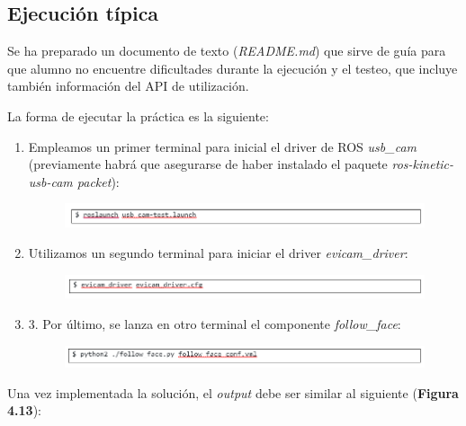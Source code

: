 \subsection{Ejecución típica}
Se ha preparado un documento de texto (\textit{README.md}) que sirve de guía para que alumno no encuentre dificultades durante la ejecución y el testeo, que incluye también información del API de utilización. 

La forma de ejecutar la práctica es la siguiente:

\begin{enumerate}
	\item Empleamos un primer terminal para inicial el driver de ROS \textit{usb\_cam} (previamente habrá que asegurarse de haber instalado el paquete \textit{ros-kinetic-usb-cam packet}):
	\begin{figure}[H]
		\begin{center}
			\includegraphics[width=0.95\linewidth]{figures/ffcomando1.png}
			\label{fig.ffcomando1}
		\end{center}
	\end{figure}
	\item Utilizamos un segundo terminal para iniciar el driver \textit{evicam\_driver}:
	\begin{figure}[H]
		\begin{center}
			\includegraphics[width=0.95\linewidth]{figures/ffcomando2.png}
			\label{fig.ffcomando2}
		\end{center}
	\end{figure}
	\item 3.	Por último, se lanza en otro terminal el componente \textit{follow\_face}:
	\begin{figure}[H]
		\begin{center}
			\includegraphics[width=0.95\linewidth]{figures/ffcomando3.png}
			\label{fig.ffcomando3}
		\end{center}
	\end{figure}
\end{enumerate}

Una vez implementada la solución, el \textit{output} debe ser similar al siguiente (\textbf{Figura 4.13}):

